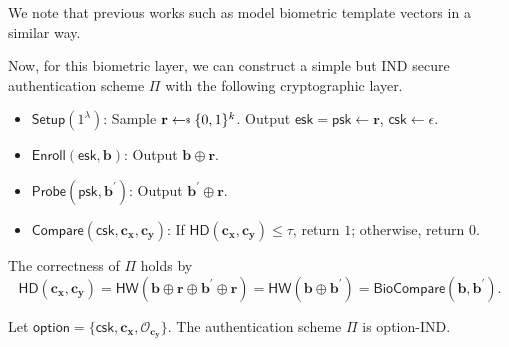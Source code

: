\noindent We note that previous works such as \cite{10.1145/1030083.1030096,cryptoeprint:2014/394} model biometric template vectors in a similar way.

Now, for this biometric layer, we can construct a simple but IND secure authentication scheme $\Pi$ with the following cryptographic layer.

\begin{itemize}

	\item $\textsf{Setup} (1^\lambda)$: Sample $\mathbf{r} \getsdollar \{0, 1\}^k$. Output $\textsf{esk} = \textsf{psk} \gets \mathbf{r}$, $\textsf{csk} \gets \epsilon$.

	\item $\textsf{Enroll}(\textsf{esk}, \mathbf{b})$: Output $\mathbf{b} \oplus \mathbf{r}$.
	
	\item $\textsf{Probe}(\textsf{psk}, \mathbf{b}^\prime)$: Output $\mathbf{b}^\prime \oplus \mathbf{r}$.

	\item $\textsf{Compare} (\textsf{csk}, \mathbf{c_x}, \mathbf{c_y})$: If $\textsf{HD}(\mathbf{c_x}, \mathbf{c_y}) \leq \tau$, return $1$; otherwise, return $0$. 

\end{itemize}
The correctness of $\Pi$ holds by
\[
	\textsf{HD}(\mathbf{c_x}, \mathbf{c_y}) = \textsf{HW}(\mathbf{b} \oplus \mathbf{r} \oplus \mathbf{b}^\prime \oplus \mathbf{r}) = \textsf{HW}(\mathbf{b} \oplus \mathbf{b}^\prime) = \textsf{BioCompare}(\mathbf{b}, \mathbf{b}^\prime).
\]

\begin{theorem}
\label{thm:rh:ind:particular-biometri-layer}
Let $\textsf{option} = \{\textsf{csk}, \mathbf{c_x}, \mathcal{O}_{\mathbf{c_y}}\}$. The authentication scheme $\Pi$ is \textsf{option}-IND.

\end{theorem}

